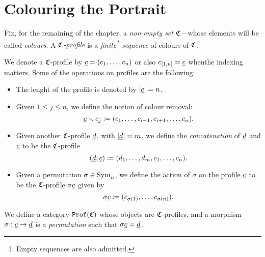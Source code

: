 \section{Colouring the Portrait}

\begin{definition}
\label{def:colors-profiles}
Fix, for the remaining of the chapter, a \emph{non-empty set} \(\mathfrak{C}\)---whose
elements will be called \emph{colours}. A \emph{\(\mathfrak{C}\)-profile} is a
\emph{finite\footnote{Empty sequences are also admitted.} sequence} of colours of
\(\mathfrak{C}\).
\end{definition}

\begin{notation}
\label{not:profiles-and-operations}
We denote a \(\mathfrak{C}\)-profile by \(\underline{c} = (c_1, \dots, c_n)\) or also
\(c_{[1, n]} = \underline{c}\) whenthe indexing matters. Some of the operations on
profiles are the following:
\begin{itemize}\setlength\itemsep{0em}
\item The lenght of the profile is denoted by \(|\underline{c}| = n\).
\item Given \(1 \leq j \leq n\), we define the notion of colour removal:
  \[
  \underline{c} \smallsetminus c_j \coloneq (c_1, \dots, c_{i-1}, c_{i+1}, \dots, c_n).
  \]
\item Given another \(\mathfrak{C}\)-profile \(\underline{d}\), with \(|\underline{d}| = m\), we
  define the \emph{concatenation} of \(\underline{d}\) and \(\underline{c}\) to be the
  \(\mathfrak{C}\)-profile
  \[
  (\underline{d}, \underline{c}) \coloneq (d_1, \dots, d_m, c_1, \dots, c_n).
  \]
\item Given a permutation \(\sigma \in \operatorname{Sym}_n\), we define the action of
  \(\sigma\) on the profile \(\underline{c}\) to be the \(\mathfrak{C}\)-profile \(\sigma
  \underline{c}\) given by
  \[
  \sigma \underline{c} \coloneq (c_{\sigma(1)}, \dots, c_{\sigma(n)}).
  \]
\end{itemize}
\end{notation}

\begin{definition}
\label{def:profile-category}
We define a category \({\texttt{Prof}(\mathfrak{C})}\) whose objects are \(\mathfrak{C}\)-profiles, and a
morphism \(\sigma: \underline{c} \to \underline{d}\) is a \emph{permutation} such that
\(\sigma \underline{c} = \underline{d}\).
\end{definition}

